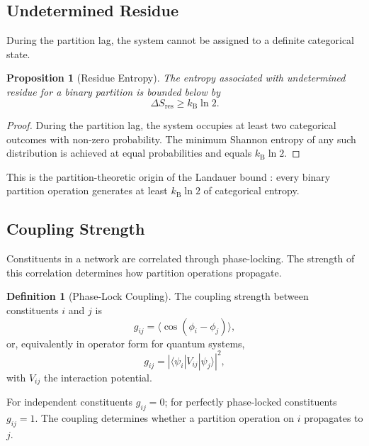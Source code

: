 \documentclass[twocolumn,10pt,a4paper]{article}
\newtheorem{proposition}[theorem]{Proposition}
\theoremstyle{definition}
\newtheorem{definition}[theorem]{Definition}
\theoremstyle{remark}
\newcommand{\kB}{k_{\mathrm{B}}}
\begin{document}
\subsection{Undetermined Residue}

During the partition lag, the system cannot be assigned to a definite categorical state.

\begin{proposition}[Residue Entropy]
\label{prop:residue}
The entropy associated with undetermined residue for a binary partition is bounded below by
\begin{equation}
\Delta S_{\mathrm{res}} \geq \kB \ln 2.
\label{eq:residue_entropy}
\end{equation}
\end{proposition}

\begin{proof}
During the partition lag, the system occupies at least two categorical outcomes with non-zero probability. The minimum Shannon entropy of any such distribution is achieved at equal probabilities and equals $\kB \ln 2$.
\end{proof}

This is the partition-theoretic origin of the Landauer bound \citep{landauer1961,bennett1982}: every binary partition operation generates at least $\kB \ln 2$ of categorical entropy.

\subsection{Coupling Strength}

Constituents in a network are correlated through phase-locking. The strength of this correlation determines how partition operations propagate.

\begin{definition}[Phase-Lock Coupling]
\label{def:coupling}
The coupling strength between constituents $i$ and $j$ is
\begin{equation}
g_{ij} = \langle \cos(\phi_i - \phi_j)\rangle,
\label{eq:coupling_phase}
\end{equation}
or, equivalently in operator form for quantum systems,
\begin{equation}
g_{ij} = |\langle \psi_i | V_{ij} | \psi_j\rangle|^2,
\label{eq:coupling_operator}
\end{equation}
with $V_{ij}$ the interaction potential.
\end{definition}

For independent constituents $g_{ij} = 0$; for perfectly phase-locked constituents $g_{ij} = 1$. The coupling determines whether a partition operation on $i$ propagates to $j$.
\end{document}
